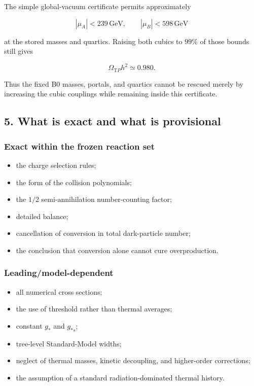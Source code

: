 \documentclass[
]{article}
\providecommand{\tightlist}{%
  \setlength{\itemsep}{0pt}\setlength{\parskip}{0pt}}
\begin{document}
The simple global-vacuum certificate permits approximately

\[
|\mu_A|<239\,\mathrm{GeV},\qquad |\mu_B|<598\,\mathrm{GeV}
\]

at the stored masses and quartics. Raising both cubics to \(99\%\) of
those bounds still gives

\[
\Omega_{\mathrm TP}h^2\simeq0.980.
\]

Thus the fixed B0 masses, portals, and quartics cannot be rescued merely
by increasing the cubic couplings while remaining inside this
certificate.

\hypertarget{what-is-exact-and-what-is-provisional}{%
\subsection{5. What is exact and what is
provisional}\label{what-is-exact-and-what-is-provisional}}

\hypertarget{exact-within-the-frozen-reaction-set}{%
\subsubsection{Exact within the frozen reaction
set}\label{exact-within-the-frozen-reaction-set}}

\begin{itemize}
\tightlist
\item
  the charge selection rules;
\item
  the form of the collision polynomials;
\item
  the \(1/2\) semi-annihilation number-counting factor;
\item
  detailed balance;
\item
  cancellation of conversion in total dark-particle number;
\item
  the conclusion that conversion alone cannot cure overproduction.
\end{itemize}

\hypertarget{leadingmodel-dependent}{%
\subsubsection{Leading/model-dependent}\label{leadingmodel-dependent}}

\begin{itemize}
\tightlist
\item
  all numerical cross sections;
\item
  the use of threshold rather than thermal averages;
\item
  constant \(g_*\) and \(g_{*s}\);
\item
  tree-level Standard-Model widths;
\item
  neglect of thermal masses, kinetic decoupling, and higher-order
  corrections;
\item
  the assumption of a standard radiation-dominated thermal history.
\end{itemize}
\end{document}
